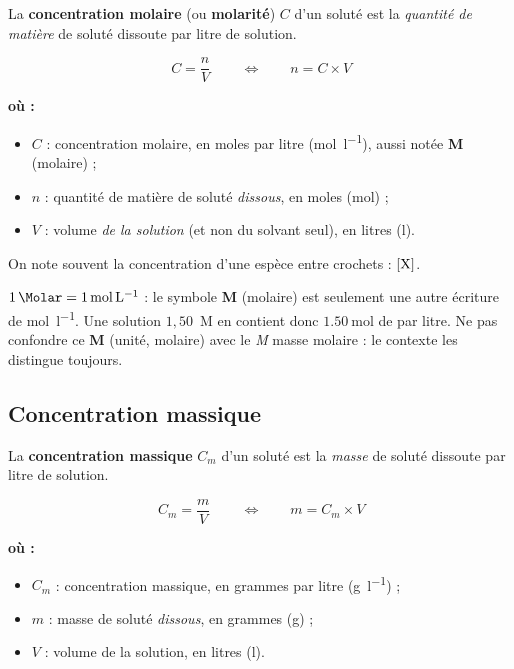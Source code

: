 \documentclass[11pt,a4paper]{article}
\newenvironment{ou}{%
  \par\smallskip\noindent\textbf{où :}\nopagebreak
  \begin{itemize}[leftmargin=1.8em,topsep=2pt,itemsep=1.5pt,parsep=0pt]}%
  {\end{itemize}}
\begin{document}
\begin{definition}
La \textbf{concentration molaire} (ou \textbf{molarité}) $C$ d'un soluté est la \emph{quantité de
matière} de soluté dissoute par litre de solution.
\end{definition}

\begin{formule}
\[ \boxed{\,C = \dfrac{n}{V}\,}\qquad\Longleftrightarrow\qquad n = C\times V \]
\begin{ou}
  \item $C$ : concentration molaire, en moles par litre (\si{\mole\per\litre}), aussi notée \textbf{M} (\og molaire\fg{}) ;
  \item $n$ : quantité de matière de soluté \emph{dissous}, en moles (\si{\mole}) ;
  \item $V$ : volume \emph{de la solution} (et non du solvant seul), en litres (\si{\litre}).
\end{ou}
On note souvent la concentration d'une espèce  entre crochets : $[\ce{X}]$.
\end{formule}

\begin{attention}
$\SI{1}{\Molar} = \SI{1}{\mole\per\litre}$ : le symbole \textbf{M} (\og molaire\fg{}) est seulement
une autre écriture de \si{\mole\per\litre}. Une solution \og $1{,}50$~M en  \fg{} contient
donc $\SI{1.50}{\mole}$ de  par litre. Ne pas confondre ce \textbf{M} (unité, molaire) avec
le \emph{M} masse molaire : le contexte les distingue toujours.
\end{attention}

\subsection{Concentration massique}

\begin{definition}
La \textbf{concentration massique} $C_m$ d'un soluté est la \emph{masse} de soluté dissoute par
litre de solution.
\end{definition}

\begin{formule}
\[ \boxed{\,C_m = \dfrac{m}{V}\,}\qquad\Longleftrightarrow\qquad m = C_m\times V \]
\begin{ou}
  \item $C_m$ : concentration massique, en grammes par litre (\si{\gram\per\litre}) ;
  \item $m$ : masse de soluté \emph{dissous}, en grammes (\si{\gram}) ;
  \item $V$ : volume de la solution, en litres (\si{\litre}).
\end{ou}
\end{formule}
\end{document}

